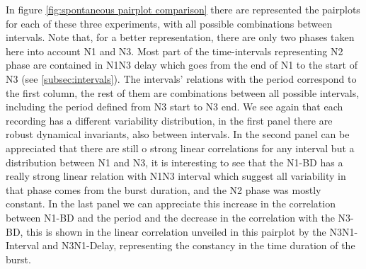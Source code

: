 In figure \ref{fig:spontaneous pairplot comparison} there are represented the pairplots for each of these three experiments, with all possible combinations between intervals. Note that, for a better representation, there are only two phases taken here into account N1 and N3. Most part of the time-intervals representing N2 phase are contained in N1N3 delay which goes from the end of N1 to the start of N3 (see \ref{subsec:intervals}). The intervals' relations with the period correspond to the first column, the rest of them are combinations between all possible intervals, including the period defined from N3 start to N3 end. We see again that each recording has a different variability distribution, in the first panel there are robust dynamical invariants, also between intervals. In the second panel can be appreciated that there are still o strong linear correlations for any interval but a distribution between N1 and N3, it is interesting to see that the N1-BD has a really strong linear relation with N1N3 interval which suggest all variability in that phase comes from the burst duration, and the N2 phase was mostly constant. In the last panel we can appreciate this increase in the correlation between N1-BD and the period and the decrease in the correlation with the N3-BD, this is shown in the linear correlation unveiled in this pairplot by the N3N1-Interval and N3N1-Delay, representing the constancy in the time duration of the burst.  

